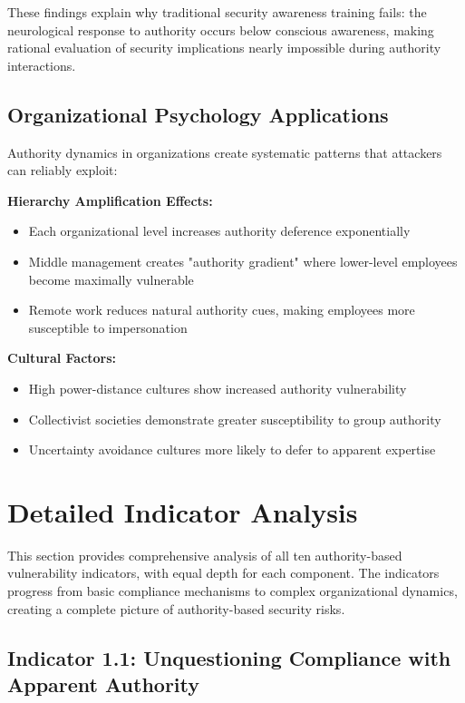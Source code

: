 \documentclass[11pt,a4paper]{article}
\begin{document}
These findings explain why traditional security awareness training fails: the neurological response to authority occurs below conscious awareness, making rational evaluation of security implications nearly impossible during authority interactions.

\subsection{Organizational Psychology Applications}

Authority dynamics in organizations create systematic patterns that attackers can reliably exploit:

\textbf{Hierarchy Amplification Effects:}
\begin{itemize}
\item Each organizational level increases authority deference exponentially
\item Middle management creates "authority gradient" where lower-level employees become maximally vulnerable
\item Remote work reduces natural authority cues, making employees more susceptible to impersonation
\end{itemize}

\textbf{Cultural Factors:}
\begin{itemize}
\item High power-distance cultures show increased authority vulnerability
\item Collectivist societies demonstrate greater susceptibility to group authority
\item Uncertainty avoidance cultures more likely to defer to apparent expertise
\end{itemize}

\section{Detailed Indicator Analysis}

This section provides comprehensive analysis of all ten authority-based vulnerability indicators, with equal depth for each component. The indicators progress from basic compliance mechanisms to complex organizational dynamics, creating a complete picture of authority-based security risks.

\subsection{Indicator 1.1: Unquestioning Compliance with Apparent Authority}
\end{document}
